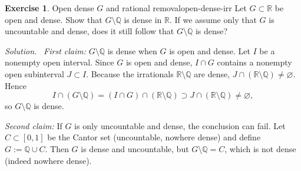 \documentclass[11pt,a4paper]{article}
\theoremstyle{definition}
\newtheorem{exercise}{Exercise} %
\theoremstyle{definition}
\theoremstyle{plain}
\theoremstyle{remark}
\newenvironment{solution}{\par\noindent\textit{Solution.}\ }{\par\vspace{0.5em}}
\begin{document}

\begin{exercise}{Open dense $G$ and rational removal}{open-dense-irr}
	Let $G\subset\mathbb R$ be open and dense. Show that $G\setminus\mathbb Q$ is dense in $\mathbb R$.
	If we assume only that $G$ is uncountable and dense, does it still follow that $G\setminus\mathbb Q$ is dense?
\end{exercise}

\begin{solution}
	\emph{First claim:} $G\setminus\mathbb Q$ is dense when $G$ is open and dense.
	Let $I$ be a nonempty open interval. Since $G$ is open and dense, $I\cap G$ contains a nonempty
	open subinterval $J\subset I$. Because the irrationals $\mathbb R\setminus\mathbb Q$ are dense,
	$J\cap(\mathbb R\setminus\mathbb Q)\neq\varnothing$. Hence
	\[
	I\cap(G\setminus\mathbb Q)=(I\cap G)\cap(\mathbb R\setminus\mathbb Q)\supset J\cap(\mathbb R\setminus\mathbb Q)\neq\varnothing,
	\]
	so $G\setminus\mathbb Q$ is dense.
	
	\medskip
	\emph{Second claim:} If $G$ is only uncountable and dense, the conclusion can fail.
	Let $C\subset[0,1]$ be the Cantor set (uncountable, nowhere dense) and define $G:=\mathbb Q\cup C$.
	Then $G$ is dense and uncountable, but $G\setminus\mathbb Q=C$, which is not dense (indeed nowhere dense).
\end{solution}
\end{document}
